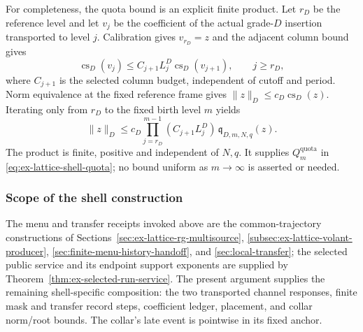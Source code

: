 For completeness, the quota bound is an explicit finite product. Let
$r_D$ be the reference level and let $v_j$ be the coefficient of the
actual grade-$D$ insertion transported to level $j$. Calibration gives
$v_{r_D}=z$ and the adjacent column bound gives
\[
 \operatorname{cs}_D(v_j)\le C_{j+1}L_j^D
                  \operatorname{cs}_D(v_{j+1}),\qquad j\ge r_D,
\]
where $C_{j+1}$ is the selected column budget, independent of cutoff and
period. Norm equivalence at the fixed reference frame gives
$\|z\|_D\le c_D\operatorname{cs}_D(z)$. Iterating only from $r_D$ to
the fixed birth level $m$ yields
\[
 \|z\|_D\le
 c_D\prod_{j=r_D}^{m-1}(C_{j+1}L_j^D)\,
                    \mathfrak q_{D,m,N,q}(z).
\]
The product is finite, positive and independent of $N,q$. It supplies
$Q_m^{\mathrm{quota}}$ in \eqref{eq:ex-lattice-shell-quota}; no bound
uniform as $m\to\infty$ is asserted or needed.

\subsubsection{Scope of the shell construction}

The menu and transfer receipts invoked above are the common-trajectory
constructions of Sections~\ref{sec:ex-lattice-rg-multisource},
\ref{subsec:ex-lattice-volant-producer},
\ref{sec:finite-menu-history-handoff}, and
\ref{sec:local-transfer}; the selected public service and its endpoint
support exponents are supplied by Theorem~\ref{thm:ex-selected-run-service}.
The present argument supplies the remaining shell-specific composition:
the two transported channel responses, finite mask and transfer record steps,
coefficient ledger, placement, and collar norm/root bounds. The collar's
late event is pointwise in its fixed anchor.
